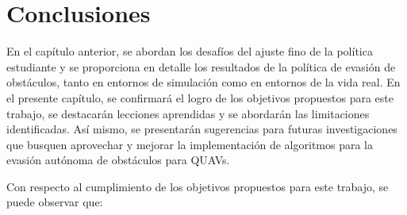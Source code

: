 \chapter{Conclusiones}
\label{capitulo7}

En el capítulo anterior, se abordan los desafíos del ajuste fino de la política estudiante y se proporciona en detalle los resultados de la política de evasión de obstáculos, tanto en entornos de simulación como en entornos de la vida real. En el presente capítulo, se confirmará el logro de los objetivos propuestos para este trabajo, se destacarán lecciones aprendidas y se abordarán las limitaciones identificadas. Así mismo, se presentarán sugerencias para futuras investigaciones que busquen aprovechar y mejorar la implementación de algoritmos para la evasión autónoma de obstáculos para QUAVs.

Con respecto al cumplimiento de los objetivos propuestos para este trabajo, se puede observar que: 

